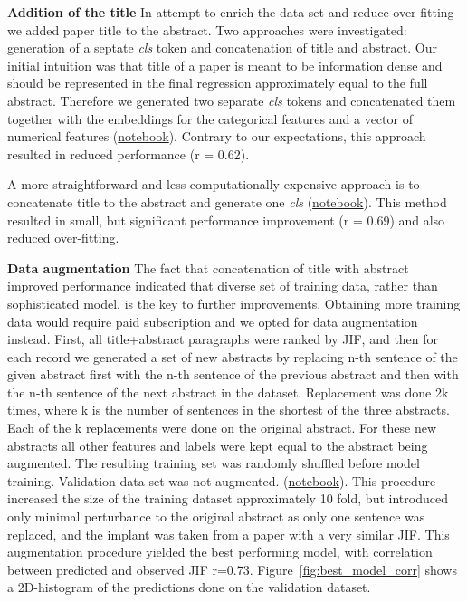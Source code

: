 \documentclass[11pt]{article}
\begin{document}
\textbf{Addition of the title} In attempt to enrich the data set and reduce over fitting we added paper title to the abstract. Two approaches were investigated: generation of a septate \textit{cls}  token and concatenation of title and abstract. Our initial intuition was that title of a paper is meant to be information dense and should be represented in the final regression approximately equal to the full abstract. Therefore we generated two separate \textit{cls} tokens and concatenated them together with the embeddings for the categorical features and a vector of numerical features (\href{https://github.com/ArtemChemist/w266_project/blob/main/Notebooks/sciBERT%20%2B%20sciBERT%20%2B%20small%20meta.ipynb}{notebook}). Contrary to our expectations, this approach resulted in reduced performance (r = 0.62).

A more straightforward and less computationally expensive approach is to concatenate title to the abstract and generate one \textit{cls} (\href{https://github.com/ArtemChemist/w266_project/blob/main/Notebooks/sciBERT%20w%20tit%2Babs.ipynb}{notebook}). This method resulted in small, but significant performance improvement (r = 0.69) and also reduced over-fitting.

\textbf{Data augmentation} The fact that concatenation of title with abstract improved performance indicated that diverse set of training data, rather than sophisticated model, is the key to further improvements. Obtaining more training data would require paid subscription and we opted for data augmentation instead. First, all title+abstract paragraphs were ranked by JIF, and then for each record we generated a set of new abstracts by replacing n-th sentence of the given abstract first with the n-th sentence of the previous abstract and then with the n-th sentence of the next abstract in the dataset. Replacement was done 2k times, where k is the number of sentences in the shortest of the three abstracts. Each of the k replacements were done on the original abstract. For these new abstracts all other features and labels were kept equal to the abstract being augmented. The resulting training set was randomly shuffled before model training. Validation data set was not augmented. (\href{https://github.com/ArtemChemist/w266_project/blob/main/Notebooks/sciBERT%20aug.ipynb}{notebook}). This procedure increased the size of the training dataset approximately 10 fold, but introduced only minimal perturbance to the original abstract as only one sentence was replaced, and the implant was taken from a paper with a very similar JIF. This augmentation procedure yielded the best performing model, with correlation between predicted and observed JIF r=0.73. Figure~\ref{fig:best_model_corr} shows a 2D-histogram of the predictions done on the validation dataset.
\end{document}
